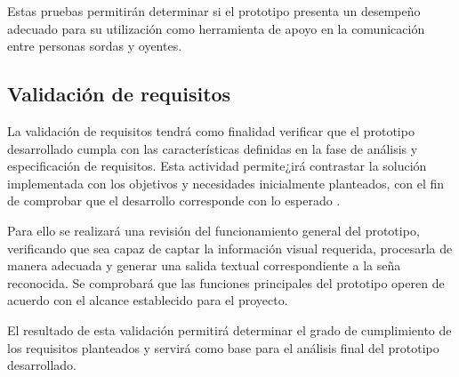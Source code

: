 	Estas pruebas permitirán determinar si el prototipo presenta un desempeño
	adecuado para su utilización como herramienta de apoyo en la comunicación entre personas sordas y oyentes.
	
	\subsection{Validación de requisitos}
	
	La validación de requisitos tendrá como finalidad verificar que el prototipo
	desarrollado cumpla con las características definidas en la fase
	de análisis y especificación de requisitos. Esta
	actividad permite¿irá contrastar la solución implementada con los objetivos y
	necesidades inicialmente planteados, con el fin de comprobar que el 
	desarrollo corresponde con lo esperado \cite{pressman2014,mall2018}.
	
	Para ello se realizará una revisión del funcionamiento general del prototipo,
	verificando que sea capaz de captar la información visual requerida,
	procesarla de manera adecuada y generar una salida textual correspondiente a
	la seña reconocida. Se comprobará que las funciones principales del
	prototipo operen de acuerdo con el alcance establecido para el proyecto.
	
	El resultado de esta validación permitirá determinar el grado de cumplimiento
	de los requisitos planteados y servirá como base para el análisis final del
	prototipo desarrollado.
	\newpage
	
